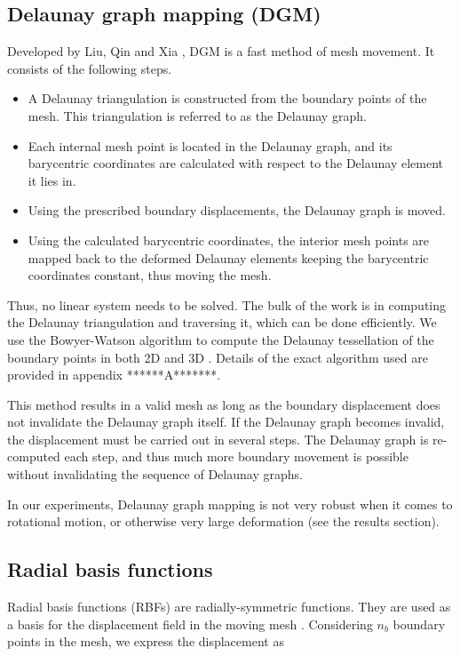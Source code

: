  \subsection{Delaunay graph mapping (DGM)}
 Developed by Liu, Qin and Xia \cite{mm:dgm}, DGM is a fast method of mesh movement. It consists of the following steps.
 \begin{itemize}
 	\item A Delaunay triangulation is constructed from the boundary points of the mesh. This triangulation is referred to as the Delaunay graph.
 	\item Each internal mesh point is located in the Delaunay graph, and its barycentric coordinates are calculated with respect to the Delaunay element it lies in.
 	\item Using the prescribed boundary displacements, the Delaunay graph is moved.
 	\item Using the calculated barycentric coordinates, the interior mesh points are mapped back to the deformed Delaunay elements keeping the barycentric coordinates constant, thus moving the mesh.
 \end{itemize}
 Thus, no linear system needs to be solved. The bulk of the work is in computing the Delaunay triangulation and traversing it, which can be done efficiently. We use the Bowyer-Watson algorithm to compute the Delaunay tessellation of the boundary points in both 2D and 3D \cite{bowyer}. Details of the exact algorithm used are provided in appendix ******A*******.
 
 This method results in a valid mesh as long as the boundary displacement does not invalidate the Delaunay graph itself. If the Delaunay graph becomes invalid, the displacement must be carried out in several steps. The Delaunay graph is re-computed each step, and thus much more boundary movement is possible without invalidating the sequence of Delaunay graphs.
 
 In our experiments, Delaunay graph mapping is not very robust when it comes to rotational motion, or otherwise very large deformation (see the results section).
 
 \subsection{Radial basis functions}
 
 Radial basis functions (RBFs) are radially-symmetric functions. They are used as a basis for the displacement field in the moving mesh \cite{mm:rbf}. Considering $n_b$ boundary points in the mesh, we express the displacement as
 
